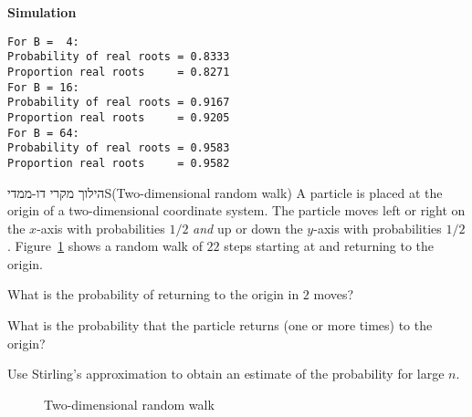\textbf{Simulation}
\begin{verbatim}
For B =  4:
Probability of real roots = 0.8333
Proportion real roots     = 0.8271
For B = 16:
Probability of real roots = 0.9167
Proportion real roots     = 0.9205
For B = 64:
Probability of real roots = 0.9583
Proportion real roots     = 0.9582
\end{verbatim}


\begin{prob}{הילוך מקרי דו-ממדי}{S}{(Two-dimensional random walk)}
A particle is placed at the origin of a two-dimensional coordinate system. The particle moves left or right on the $x$-axis with probabilities $1/2$ \emph{and} up or down the $y$-axis with probabilities $1/2$. Figure~\ref{f.2d-random-walk} shows a random walk of $22$ steps starting at and returning to the origin.

 What is the probability of returning to the origin in $2$ moves?

 What is the probability that the particle returns (one or more times) to the origin?

 Use Stirling's approximation to obtain an estimate of the probability for large $n$.

\begin{figure}[t]
\begin{center}
\end{center}
\caption{Two-dimensional random walk}\label{f.2d-random-walk}
\end{figure}

\end{prob}

